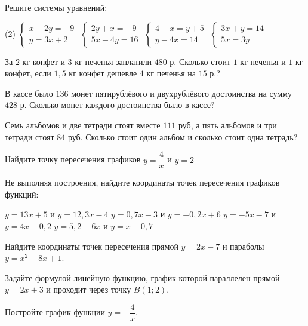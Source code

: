 \begin{class}[number=3]
	\begin{listofex}
		\item Решите системы уравнений:
		\begin{tasks}(2)
			\task \( \begin{cases}
				x-2y=-9\\ y=3x+2
			\end{cases} \)
			\task \( \begin{cases}
				2y+x=-9\\ 5x-4y=16
			\end{cases} \)
			\task \( \begin{cases}
				4-x=y+5\\ y-4x=14
			\end{cases} \)
			\task \( \begin{cases}
				3x+y=14\\ 5x=3y
			\end{cases} \)
		\end{tasks}
		\item  За \( 2 \) кг конфет и \( 3 \) кг печенья заплатили \( 480 \) р. Сколько стоит \( 1 \) кг печенья и \( 1 \) кг конфет, если \( 1,5 \) кг конфет дешевле \( 4 \) кг печенья на \( 15 \) р.?
		\item  В кассе было \( 136 \) монет пятирублёвого и  двухрублёвого достоинства на сумму \( 428 \) р. Сколько монет каждого достоинства было в кассе?
		\item Семь альбомов и две тетради стоят вместе \( 111 \) руб, а пять альбомов и три тетради стоят \( 84 \) руб. Сколько стоит один альбом и сколько стоит одна тетрадь?
		\item Найдите точку пересечения графиков \( y=\dfrac{4}{x} \) и \( y=2 \) 
		\item Не выполняя построения, найдите координаты точек пересечения графиков функций:
		\begin{tasks}
			\task \( y=13x +5 \) и \(y=12,3x-4\)
			\task \( y=0,7x-3 \) и \(y=-0,2x+6\)
			\task \( y=-5x-7 \) и \( y=4x-0,2 \)
			\task \( y=5,2-6x \) и \( y=x-0,7 \)
		\end{tasks}
		\item Найдите координаты точек пересечения прямой \( y=2x-7 \) и параболы \( y=x^2+8x+1 \).
		\item Задайте формулой линейную функцию, график которой параллелен прямой \(y=2x+3\) и проходит через точку \( B(1; 2) \).
		\item Постройте график функции \( y=-\dfrac{4}{x} \).
	\end{listofex}
\end{class}

